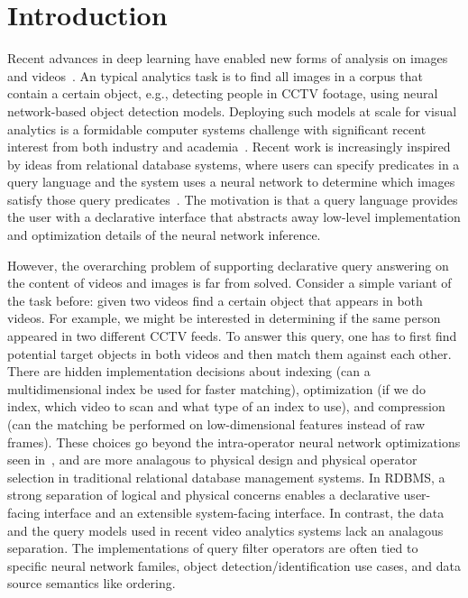 \section{Introduction}\label{intro}\sloppy
Recent advances in deep learning have enabled new forms of analysis on images and videos~\cite{lecun2015deep}. 
An typical analytics task is to find all images in a corpus that contain a certain object, e.g., detecting people in CCTV footage, using neural network-based object detection models.  
Deploying such models at scale for visual analytics is a formidable computer systems challenge with significant recent interest from both industry and academia~\cite{kang2017noscope, anderson2018predicate, kang2018blazeit, chetlur2014cudnn, fengeva, zhang2018ffs, anderson2018physical, jiang2018mainstream, jiang2018chameleon}. 
Recent work is increasingly inspired by ideas from relational database systems, where users can specify predicates in a query language and the system uses a neural network to determine which images satisfy those query predicates~\cite{kang2018blazeit,wu2018querying}.
The motivation is that a query language provides the user with a declarative interface that abstracts away low-level implementation and optimization details of the neural network inference.

However, the overarching problem of supporting declarative query answering on the content of videos and images is far from solved.
Consider a simple variant of the task before: given two videos find a certain object that appears in both videos. For example, we might be interested in determining if the same person appeared in two different CCTV feeds. To answer this query, one has to first find potential target objects in both videos and then match them against each other. There are hidden implementation decisions about indexing (can a multidimensional index be used for faster matching), optimization (if we do index, which video to scan and what type of an index to use), and compression (can the matching be performed on low-dimensional features instead of raw frames). These choices go beyond the intra-operator neural network optimizations seen in~\cite{kang2017noscope, zhang2018ffs, anderson2018physical, jiang2018chameleon}, and are more analagous to physical design and physical operator selection in traditional relational database management systems. In RDBMS, a strong separation of logical and physical concerns enables a declarative user-facing interface and an extensible system-facing interface. In contrast, the data and the query models used in recent video analytics systems lack an analagous separation. The implementations of query filter operators are often tied to specific neural network familes, object detection/identification use cases, and data source semantics like ordering.

